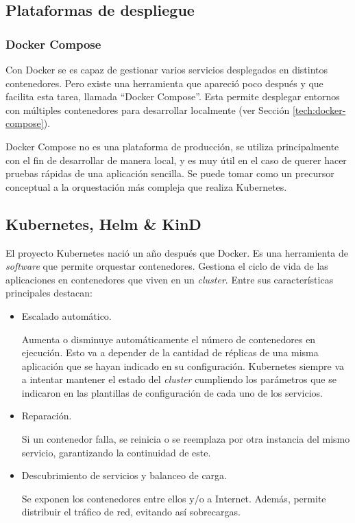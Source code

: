 \subsection*{Plataformas de despliegue}

\subsubsection*{Docker Compose}
\label{subsec:docker-compose}

Con Docker se es capaz de gestionar varios servicios desplegados en distintos contenedores. Pero existe una herramienta que apareció poco después y que facilita esta tarea, llamada ``Docker Compose''\cite{docker-compose}. Esta permite desplegar entornos con múltiples contenedores para desarrollar localmente (ver Sección \ref{tech:docker-compose}).

Docker Compose no es una plataforma de producción, se utiliza principalmente con el fin de desarrollar de manera local, y es muy útil en el caso de querer hacer pruebas rápidas de una aplicación sencilla. Se puede tomar como un precursor conceptual a la orquestación más compleja que realiza Kubernetes.

\subsection*{Kubernetes, Helm \& KinD}
\label{subsec:k8shelm}

El proyecto Kubernetes nació un año después que Docker. Es una herramienta de \textit{software} que permite orquestar contenedores. Gestiona el ciclo de vida de las aplicaciones en contenedores que viven en un \textit{cluster}. Entre sus características principales destacan:

\begin{itemize}
  \item Escalado automático.

    Aumenta o disminuye automáticamente el número de contenedores en ejecución. Esto va a depender de la cantidad de réplicas de una misma aplicación que se hayan indicado en su configuración. Kubernetes siempre va a intentar mantener el estado del \textit{cluster} cumpliendo los parámetros que se indicaron en las plantillas de configuración de cada uno de los servicios.

  \item Reparación.

    Si un contenedor falla, se reinicia o se reemplaza por otra instancia del mismo servicio, garantizando la continuidad de este.

  \item Descubrimiento de servicios y balanceo de carga.

    Se exponen los contenedores entre ellos y/o a Internet. Además, permite distribuir el tráfico de red, evitando así sobrecargas.
\end{itemize}

